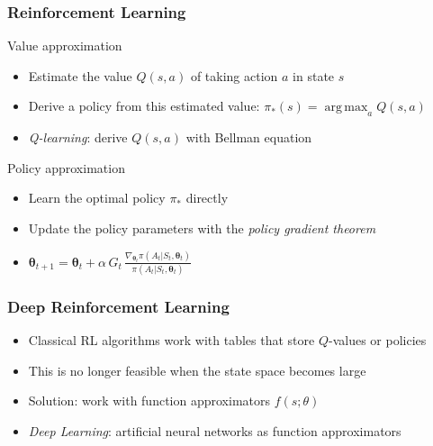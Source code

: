 \documentclass{beamer}
\DeclareMathOperator*{\argmax}{arg\,max} %
\begin{document}
\begin{frame}
\frametitle{Reinforcement Learning}
\begin{block}{Value approximation}
\begin{itemize}
    \item Estimate the value $Q(s,a) $ of taking action $a$ in state $s$
    \item Derive a policy from this estimated value: $\pi_{*}(s) = \argmax_{a} Q(s, a)$
    \item \emph{Q-learning}: derive $Q(s,a)$ with Bellman equation
\end{itemize}
\end{block}

\begin{block}{Policy approximation}
\begin{itemize}
    \item Learn the optimal policy $\pi_{*}$ directly
    \item Update the policy parameters with the \emph{policy gradient theorem}
    \item $\bm{\theta}_{t+1} = \bm{\theta}_t + \alpha \, G_t \, \frac{\nabla_{\bm{\theta}_t} \pi(A_t|S_t, \bm{\theta}_t)}{\pi(A_t|S_t, \bm{\theta}_t)}$
\end{itemize}
\end{block}
\end{frame}

\begin{frame}
\frametitle{Deep Reinforcement Learning}
\begin{itemize}
    \item Classical RL algorithms work with tables that store $Q$-values or policies
    \item This is no longer feasible when the state space becomes large
    \pause
    \item Solution: work with function approximators $f(s; \theta)$
    \item \emph{Deep Learning}: artificial neural networks as function approximators
\end{itemize}
\end{frame}
\end{document}
